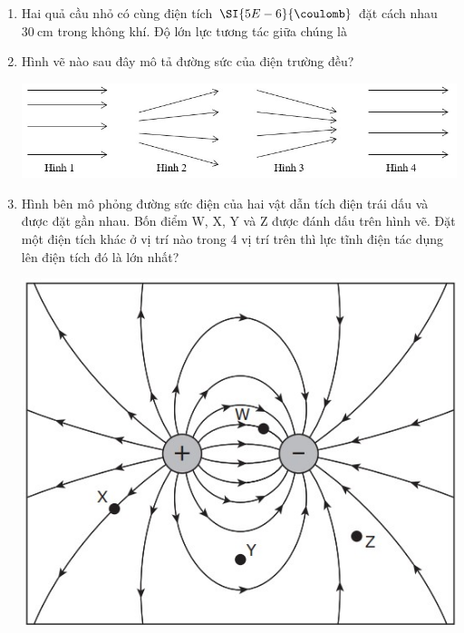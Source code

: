 \begin{enumerate}[label=\bfseries Câu \arabic*:]
\item Hai quả cầu nhỏ có cùng điện tích $\SI{5E-6}{\coulomb}$ đặt cách nhau $\SI{30}{\centi\meter}$ trong không khí. Độ lớn lực tương tác giữa chúng là

\item Hình vẽ nào sau đây mô tả đường sức của điện trường đều?
\begin{center}
	\includegraphics[width=0.8\linewidth]{../figs/PH11-MidSem2-01-1}
\end{center}

\item Hình bên mô phỏng đường sức điện của hai vật dẫn tích điện trái dấu và được đặt gần nhau. Bốn điểm W, X, Y và Z được đánh dấu trên hình vẽ. Đặt một điện tích khác ở vị trí nào trong 4 vị trí trên thì lực tĩnh điện tác dụng lên điện tích đó là lớn nhất?
\begin{center}
	\includegraphics[width=0.4\linewidth]{../figs/PH11-MidSem2-01-5}
\end{center}


\end{enumerate}
